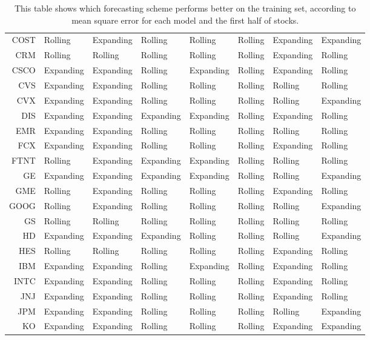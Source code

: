 \begin{table}[ht]
\begin{tabular}{rlllllll}
  COST & Rolling & Expanding & Rolling & Rolling & Rolling & Expanding & Expanding \\ 
  CRM & Rolling & Rolling & Rolling & Rolling & Rolling & Expanding & Rolling \\ 
  CSCO & Expanding & Expanding & Rolling & Expanding & Rolling & Expanding & Rolling \\ 
  CVS & Expanding & Expanding & Rolling & Rolling & Rolling & Rolling & Rolling \\ 
  CVX & Expanding & Expanding & Rolling & Rolling & Rolling & Rolling & Expanding \\ 
  DIS & Expanding & Expanding & Expanding & Expanding & Rolling & Expanding & Rolling \\ 
  EMR & Expanding & Expanding & Rolling & Rolling & Rolling & Rolling & Rolling \\ 
  FCX & Expanding & Expanding & Rolling & Rolling & Rolling & Expanding & Rolling \\ 
  FTNT & Rolling & Expanding & Expanding & Expanding & Rolling & Rolling & Rolling \\ 
  GE & Expanding & Expanding & Expanding & Expanding & Rolling & Rolling & Expanding \\ 
  GME & Rolling & Expanding & Rolling & Rolling & Rolling & Expanding & Rolling \\ 
  GOOG & Rolling & Expanding & Rolling & Rolling & Rolling & Rolling & Expanding \\ 
  GS & Rolling & Rolling & Rolling & Rolling & Rolling & Rolling & Rolling \\ 
  HD & Expanding & Expanding & Expanding & Rolling & Rolling & Rolling & Expanding \\ 
  HES & Rolling & Rolling & Rolling & Rolling & Rolling & Expanding & Rolling \\ 
  IBM & Expanding & Expanding & Rolling & Expanding & Rolling & Expanding & Rolling \\ 
  INTC & Expanding & Expanding & Rolling & Rolling & Rolling & Expanding & Rolling \\ 
  JNJ & Expanding & Expanding & Rolling & Rolling & Rolling & Expanding & Rolling \\ 
  JPM & Expanding & Expanding & Rolling & Rolling & Rolling & Rolling & Expanding \\ 
  KO & Expanding & Expanding & Rolling & Rolling & Rolling & Expanding & Expanding \\ 
   \hline
\end{tabular}
\caption[Better scheme MSE (1)]{This table shows which forecasting scheme performs better on the training set, according to mean square error 
              for each model and the first half of stocks.} 
\label{Table:Better_MSE_1}
\end{table}
